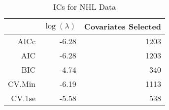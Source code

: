 \begin{table}[ht]
\centering
\begin{tabular}{rrr}
  \hline
 & $\log(\lambda)$ & Covariates Selected \\ 
  \hline
AICc & -6.28 & 1203 \\ 
  AIC & -6.28 & 1203 \\ 
  BIC & -4.74 & 340 \\ 
  CV.Min & -6.19 & 1113 \\ 
  CV.1se & -5.58 & 538 \\ 
   \hline
\end{tabular}
\caption{ICs for NHL Data} 
\label{tab:ic}
\end{table}
